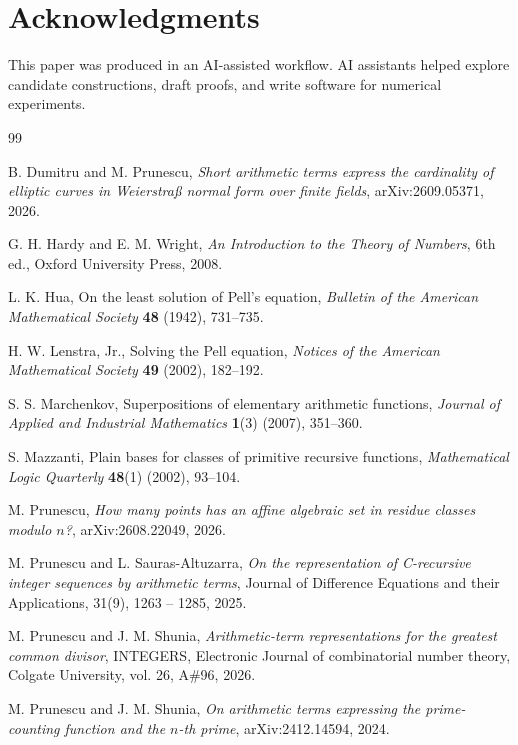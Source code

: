 \documentclass[11pt]{article}
\theoremstyle{remark}
\begin{document}
\section*{Acknowledgments}

This paper was produced in an AI-assisted workflow. AI assistants helped
explore candidate constructions, draft proofs, and write software for numerical experiments.

\begin{thebibliography}{99} 

B. Dumitru and M. Prunescu,
\emph{Short arithmetic terms express the cardinality of elliptic curves
in Weierstra\ss{} normal form over finite fields},
arXiv:2609.05371, 2026.

G. H. Hardy and E. M. Wright,
\emph{An Introduction to the Theory of Numbers}, 6th ed.,
Oxford University Press, 2008.

L. K. Hua,
On the least solution of Pell's equation,
\emph{Bulletin of the American Mathematical Society}
\textbf{48} (1942), 731--735.

H. W. Lenstra, Jr.,
Solving the Pell equation,
\emph{Notices of the American Mathematical Society}
\textbf{49} (2002), 182--192.

S. S. Marchenkov,
Superpositions of elementary arithmetic functions,
\emph{Journal of Applied and Industrial Mathematics}
\textbf{1}(3) (2007), 351--360.

S. Mazzanti,
Plain bases for classes of primitive recursive functions,
\emph{Mathematical Logic Quarterly} \textbf{48}(1) (2002), 93--104.


M. Prunescu,
\emph{How many points has an affine algebraic set in residue classes
modulo $n$?}, arXiv:2608.22049, 2026.

M. Prunescu and L. Sauras-Altuzarra,
\emph{On the representation of C-recursive integer sequences by
arithmetic terms}, Journal of Difference Equations and their Applications, 31(9), 1263 -- 1285, 2025.

M. Prunescu and J. M. Shunia,
\emph{Arithmetic-term representations for the greatest common divisor},
INTEGERS, Electronic Journal of combinatorial number theory, Colgate University, vol. 26, A\#96, 2026.

M. Prunescu and J. M. Shunia,
\emph{On arithmetic terms expressing the prime-counting function and
the $n$-th prime}, arXiv:2412.14594, 2024.


\end{thebibliography}
\end{document}
